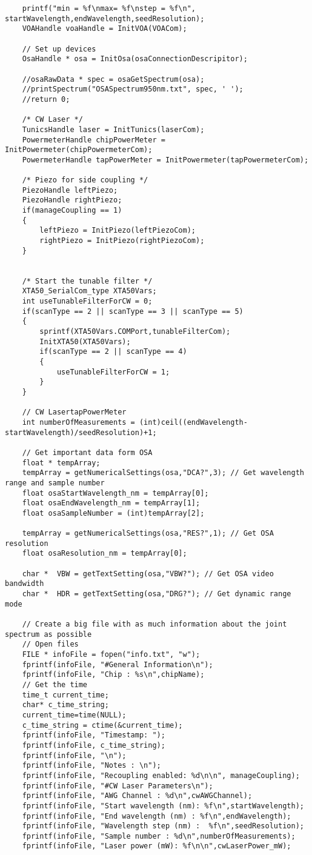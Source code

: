 \begin{lstlisting}
    printf("min = %f\nmax= %f\nstep = %f\n", startWavelength,endWavelength,seedResolution);
    VOAHandle voaHandle = InitVOA(VOACom);

    // Set up devices
    OsaHandle * osa = InitOsa(osaConnectionDescripitor);

    //osaRawData * spec = osaGetSpectrum(osa);
    //printSpectrum("OSASpectrum950nm.txt", spec, ' ');
    //return 0;

    /* CW Laser */
    TunicsHandle laser = InitTunics(laserCom);
    PowermeterHandle chipPowerMeter = InitPowermeter(chipPowermeterCom);
    PowermeterHandle tapPowerMeter = InitPowermeter(tapPowermeterCom);

    /* Piezo for side coupling */
    PiezoHandle leftPiezo;
    PiezoHandle rightPiezo;
    if(manageCoupling == 1)
    {
        leftPiezo = InitPiezo(leftPiezoCom);
        rightPiezo = InitPiezo(rightPiezoCom);
    }


    /* Start the tunable filter */
    XTA50_SerialCom_type XTA50Vars;
    int useTunableFilterForCW = 0;
    if(scanType == 2 || scanType == 3 || scanType == 5)
    {
        sprintf(XTA50Vars.COMPort,tunableFilterCom);
        InitXTA50(XTA50Vars);
        if(scanType == 2 || scanType == 4)
        {
            useTunableFilterForCW = 1;
        }
    }

    // CW LasertapPowerMeter
    int numberOfMeasurements = (int)ceil((endWavelength-startWavelength)/seedResolution)+1;

    // Get important data form OSA
    float * tempArray;
    tempArray = getNumericalSettings(osa,"DCA?",3); // Get wavelength range and sample number
    float osaStartWavelength_nm = tempArray[0];
    float osaEndWavelength_nm = tempArray[1];
    float osaSampleNumber = (int)tempArray[2];

    tempArray = getNumericalSettings(osa,"RES?",1); // Get OSA resolution
    float osaResolution_nm = tempArray[0];

    char *  VBW = getTextSetting(osa,"VBW?"); // Get OSA video bandwidth
    char *  HDR = getTextSetting(osa,"DRG?"); // Get dynamic range mode

    // Create a big file with as much information about the joint spectrum as possible
    // Open files
    FILE * infoFile = fopen("info.txt", "w");
    fprintf(infoFile, "#General Information\n");
    fprintf(infoFile, "Chip : %s\n",chipName);
    // Get the time
    time_t current_time;
    char* c_time_string;
    current_time=time(NULL);
    c_time_string = ctime(&current_time);
    fprintf(infoFile, "Timestamp: ");
    fprintf(infoFile, c_time_string);
    fprintf(infoFile, "\n");
    fprintf(infoFile, "Notes : \n");
    fprintf(infoFile, "Recoupling enabled: %d\n\n", manageCoupling);
    fprintf(infoFile, "#CW Laser Parameters\n");
    fprintf(infoFile, "AWG Channel : %d\n",cwAWGChannel);
    fprintf(infoFile, "Start wavelength (nm): %f\n",startWavelength);
    fprintf(infoFile, "End wavelength (nm) : %f\n",endWavelength);
    fprintf(infoFile, "Wavelength step (nm) :  %f\n",seedResolution);
    fprintf(infoFile, "Sample number : %d\n",numberOfMeasurements);
    fprintf(infoFile, "Laser power (mW): %f\n\n",cwLaserPower_mW);


\end{lstlisting}

